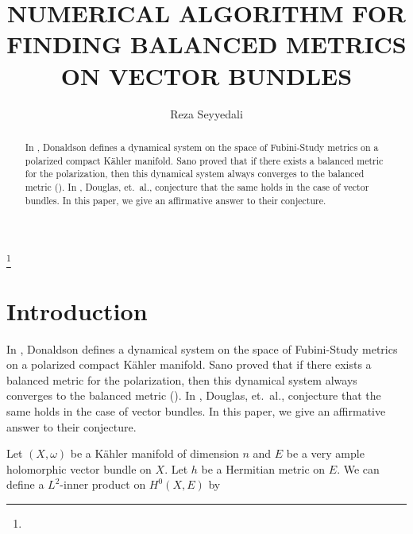 \documentclass[12pt,oneside,notitlepage]{amsart}
\theoremstyle{definition}
\theoremstyle{remark}
\numberwithin{equation}{section}
\begin{document}
\title[Stability]{NUMERICAL ALGORITHM FOR FINDING BALANCED METRICS ON VECTOR BUNDLES}\author[Seyyedali]{Reza Seyyedali}

\address{Department of Mathematics \\
   Johns Hopkins University \\
   Baltimore, MD 21218}


\thanks{}\subjclass{}\keywords{}
\begin{abstract}

In \cite{D3}, Donaldson defines a dynamical system on the space of
Fubini-Study metrics on a polarized compact K\"ahler manifold.
Sano proved that if there exists a balanced metric for the
polarization, then this dynamical system always converges to the
balanced metric (\cite{S}).
 In \cite{DKLR}, Douglas, et.\ al., conjecture that the same holds in the case of vector bundles. In this paper, we give an affirmative answer to their conjecture.

\end{abstract}
\maketitle
\pagestyle{plain} 

\newtheorem*{Mthm}{Main Theorem}
\newtheorem{Thm}{Theorem}[section]
\newtheorem{Prop}[Thm]{Proposition}
\newtheorem{Lem}[Thm]{Lemma}
\newtheorem{Cor}[Thm]{Corollary}
\newtheorem{Def}[Thm]{Definition}
\newtheorem{Guess}[Thm]{Conjecture}
\newtheorem{Ex}[Thm]{Example}
\newtheorem{Rmk}{Remark}
\newtheorem{Not}{Notation}

\section{Introduction}
In \cite{D3}, Donaldson defines a dynamical system on the space
of Fubini-Study metrics on a polarized compact K\"ahler manifold. Sano proved that if there exists a
balanced metric for the polarization, then this dynamical
system always converges to the balanced metric (\cite{S}).
 In \cite{DKLR}, Douglas, et.\ al., conjecture that the same holds in the case of vector bundles. In this paper, we give an affirmative answer to their conjecture.

Let $(X,\omega)$ be a K\"ahler manifold of dimension $n$ and $E$
be a very ample holomorphic vector bundle on $X$. Let $h$ be a
Hermitian metric on $E$. We can define a $L^2$-inner product on
$H^{0}(X,E)$ by
\end{document}
